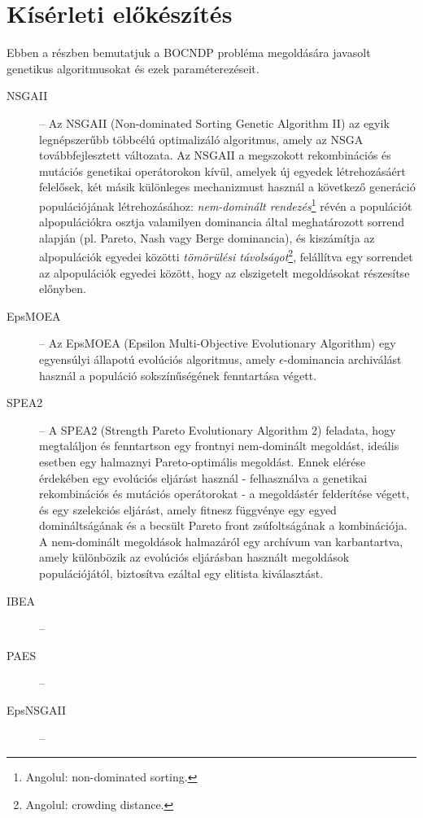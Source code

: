 \section{Kísérleti előkészítés}

Ebben a részben bemutatjuk a BOCNDP probléma megoldására javasolt genetikus algoritmusokat
és ezek paraméterezéseit.

\begin{description}
  \item[NSGAII] -- Az NSGAII (Non-dominated Sorting Genetic Algorithm II) az egyik legnépszerűbb többcélú optimalizáló algoritmus,
        amely az NSGA továbbfejlesztett változata. Az NSGAII a megszokott rekombinációs és mutációs genetikai operátorokon kívül,
        amelyek új egyedek létrehozásáért felelősek, két másik különleges mechanizmust használ a következő generáció populációjának létrehozásához:
        \textit{nem-dominált rendezés}\footnote{ Angolul: non-dominated sorting. } révén a populációt alpopulációkra
        osztja valamilyen dominancia által meghatározott sorrend alapján (pl. Pareto, Nash vagy Berge dominancia),
        és kiszámítja az alpopulációk egyedei közötti \textit{tömörülési távolságot}\footnote{ Angolul: crowding distance. },
        felállítva egy sorrendet az alpopulációk egyedei között, hogy az elszigetelt megoldásokat részesítse előnyben.
  \item[EpsMOEA] -- Az EpsMOEA (Epsilon Multi-Objective Evolutionary Algorithm) egy egyensúlyi állapotú evolúciós algoritmus,
        amely $\epsilon$-dominancia archiválást használ a populáció sokszínűségének fenntartása végett.
  \item[SPEA2] -- A SPEA2 (Strength Pareto Evolutionary Algorithm 2) feladata, hogy megtaláljon és fenntartson egy frontnyi nem-dominált megoldást,
        ideális esetben egy halmaznyi Pareto-optimális megoldást. Ennek elérése érdekében egy evolúciós eljárást használ
        - felhasználva a genetikai rekombinációs és mutációs operátorokat - a megoldástér felderítése végett,
        és egy szelekciós eljárást, amely fitnesz függvénye egy egyed domináltságának és a becsült Pareto front zsúfoltságának a kombinációja.
        A nem-dominált megoldások halmazáról egy archívum van karbantartva, amely különbözik az evolúciós eljárásban használt megoldások populációjától,
        biztosítva ezáltal egy elitista kiválasztást.
  \item[IBEA] --
  \item[PAES] --
  \item[EpsNSGAII] --
\end{description}
